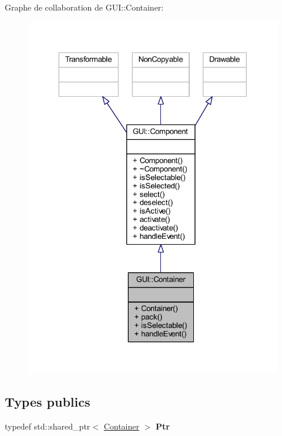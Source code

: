 Graphe de collaboration de G\+UI\+:\+:Container\+:\nopagebreak
\begin{figure}[H]
\begin{center}
\leavevmode
\includegraphics[width=324pt]{class_g_u_i_1_1_container__coll__graph}
\end{center}
\end{figure}
\subsection*{Types publics}
\begin{DoxyCompactItemize}
\item 
\hypertarget{class_g_u_i_1_1_container_aff900329cc0dbef99abdd1c95175823a}{}\label{class_g_u_i_1_1_container_aff900329cc0dbef99abdd1c95175823a} 
typedef std\+::shared\+\_\+ptr$<$ \hyperlink{class_g_u_i_1_1_container}{Container} $>$ {\bfseries Ptr}
\end{DoxyCompactItemize}
